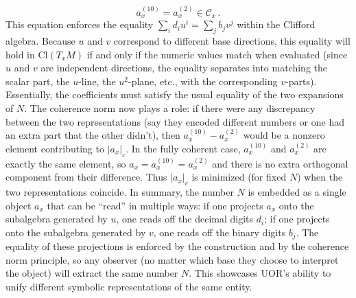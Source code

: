 \documentclass[12pt]{article}
\newcommand{\Cl}{\mathrm{Cl}}
\begin{document}
\begin{itemize}
    \[
        a_x^{(10)} = a_x^{(2)} \in \mathcal{C}_x\,.
    \] 
    This equation enforces the equality $\sum_i d_i u^i = \sum_j b_j v^j$ within the Clifford algebra. Because $u$ and $v$ correspond to different base directions, this equality will hold in $\Cl(T_xM)$ if and only if the numeric values match when evaluated (since $u$ and $v$ are independent directions, the equality separates into matching the scalar part, the $u$-line, the $u^2$-plane, etc., with the corresponding $v$-parts). Essentially, the coefficients must satisfy the usual equality of the two expansions of $N$. The coherence norm now plays a role: if there were any discrepancy between the two representations (say they encoded different numbers or one had an extra part that the other didn’t), then $a_x^{(10)} - a_x^{(2)}$ would be a nonzero element contributing to $|a_x|_c$. In the fully coherent case, $a_x^{(10)}$ and $a_x^{(2)}$ are exactly the same element, so $a_x = a_x^{(10)} = a_x^{(2)}$ and there is no extra orthogonal component from their difference. Thus $|a_x|_c$ is minimized (for fixed $N$) when the two representations coincide. In summary, the number $N$ is embedded as a single object $a_x$ that can be “read” in multiple ways: if one projects $a_x$ onto the subalgebra generated by $u$, one reads off the decimal digits $d_i$; if one projects onto the subalgebra generated by $v$, one reads off the binary digits $b_j$. The equality of these projections is enforced by the construction and by the coherence norm principle, so any observer (no matter which base they choose to interpret the object) will extract the same number $N$. This showcases UOR’s ability to unify different symbolic representations of the same entity.


\end{itemize}
\end{document}
